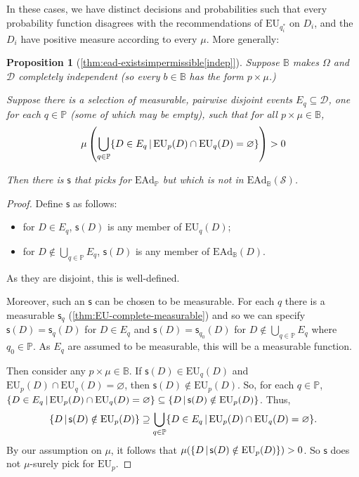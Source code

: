 \documentclass[a4paper,final]{article}
\newtheorem{proposition}[theorem]{Proposition}
\renewcommand\P{\mathbb{P}} %
\newcommand\EU{\mathrm{EU}}
\newcommand\EAd{\mathrm{EAd}}
\newcommand{\Decs}{\mathcal{D}}
\renewcommand\S{\mathcal{S}}
\newcommand\s{\mathsf{s}}
\newcommand{\IB}{\mathbb{B}}
\newcommand{\IP}{\P}
\renewcommand{\color}[1]{}
\newenvironment{colored}[1]{\leavevmode\color{#1}}{}
\newcommand\SetDelimiter[1][]{
	\nonscript\,#1\vert \allowbreak \nonscript\,\mathopen{}}
\providecommand\given{\SetDelimiter}
\renewcommand{\emptyset}{\varnothing}
\newenvironment{CCM rewritten}
{\begingroup\color{blue}} %
{\endgroup}              %
\begin{document}
In these cases, we have distinct decisions and probabilities such that every probability function disagrees with the recommendations of $\EU_{q^*_i}$ on $D_i$, and the $D_i$ have positive measure according to every $\mu$. More generally:
\begin{proposition}[\cref{thm:ead-existsimpermissible[indep]}]

Suppose $\IB$ makes $\Omega$ and $\Decs$ completely independent (so every $b\in\IB$ has the form $p\times\mu$.)

Suppose there is a selection of measurable, pairwise disjoint events $E_q\subseteq\Decs$, one for each $q\in\IP$ (some of which may be empty), such that for all $p\times\mu\in\IB$, 
\[
\mu\left(\bigcup_{q\in\IP}\{D\in E_q\given \EU_p(D)\cap\EU_q(D)=\emptyset\}\right)>0
\]

Then there is $\s$ that picks for $\EAd_\IP$ but which is not in $\EAd_\IB(\S)$. 
\end{proposition}
\begin{proof}
	Define $\s$ as follows:
	\begin{itemize}
	\item for $D \in E_q$, $\s(D)$ is any member of  $\EU_q(D)$; 
	\item for $D\notin \bigcup_{q\in\IP}E_q$, $\s(D)$ is any member of $\EAd_\IB(D)$.
	\end{itemize} 
	
	As they are disjoint, this is well-defined. 
	
	\begin{colored}{violet}
		Moreover, such an $\s$ can be chosen to be measurable. For each $q$ there is a measurable $\s_q$ (\cref{thm:EU-complete-measurable}) and so we can specify $\s(D)=\s_q(D)$ for $D\in E_q$ and $\s(D)=\s_{q_0}(D)$ for $D\notin \bigcup_{q\in\IP}E_q$ where $q_0\in\IP$. As $E_q$ are assumed to be measurable, this will be a measurable function. 
	\end{colored}
	
	Then consider any $p \times \mu\in\IB$. 
	If $\s(D)\in\EU_q(D)$ and $\EU_p(D)\cap\EU_q(D)=\emptyset$, then $\s(D)\notin\EU_p(D)$. 
		So, for each $q\in\IP$, $\{D\in E_q\given \EU_p(D)\cap\EU_q(D)=\emptyset\}\subseteq\{D\given \s(D)\notin\EU_p(D)\}$. Thus, $$\{D\given \s(D)\notin\EU_p(D)\}\supseteq\bigcup_{q\in\IP}\{D\in E_q\given \EU_p(D)\cap\EU_q(D)=\emptyset\}.$$ By our assumption on $\mu$, it follows that $\mu(\{D\given \s(D)\notin\EU_p(D)\})>0$. So $\s$ does not $\mu$-surely pick for $\EU_p$. 
\end{proof}
\end{document}
